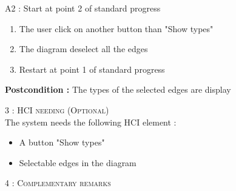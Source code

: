 \begin{flushleft}
    A2 : Start at point 2 of standard progress
    \begin{enumerate}[nosep]
        \item The user click on another button than "Show types"
        \item The diagram deselect all the edges
        \item Restart at point 1 of standard progress
    \end{enumerate}

    \textbf{\large Postcondition :} The types of the selected edges are display

    \BlackLine
    \textsc{\Large 3 : HCI needing (Optional)}\\[0.3cm]
    The system needs the following HCI element :
    \begin{itemize}
        \item A button "Show types"
        \item Selectable edges in the diagram
    \end{itemize}

    \BlackLine
    \textsc{\Large 4 : Complementary remarks}\\[0.3cm]

\end{flushleft}
